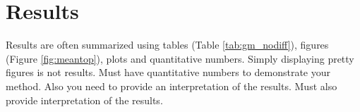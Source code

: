 \documentclass[12pt,portrait]{article}
\begin{document}
\section{Results}
Results are often summarized using  tables (Table \ref{tab:gm_nodiff}), figures (Figure \ref{fig:meantop}), plots and quantitative numbers. Simply displaying pretty figures is not results. Must have quantitative numbers to demonstrate your method. Also you need to provide an interpretation of the results. Must also provide interpretation of the results. 


\begin{table}[t] 
\caption{Sample table summarizing the performance of the proposed topological loss $\mathcal{L}_{top}$ over other baseline methods. Generated by a former student who took the class \citep{song.2023}.}
\label{tab:gm_nodiff}
\centering
{}
\end{table}
\end{document}

